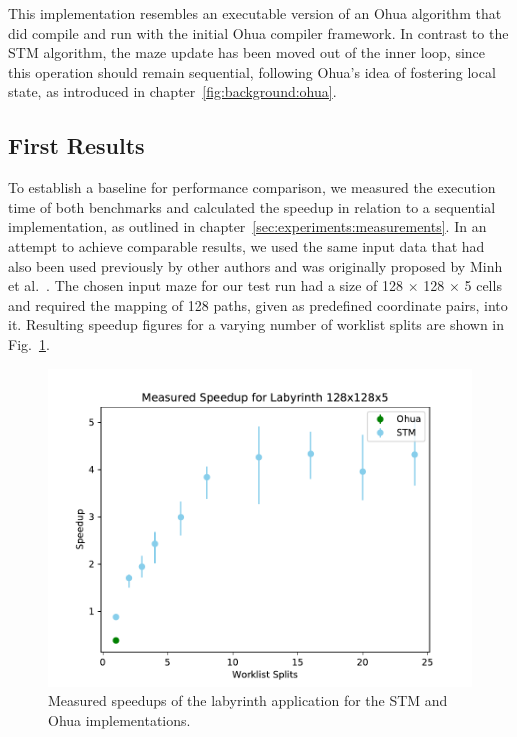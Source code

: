 This implementation resembles an executable version of an Ohua algorithm that did compile and run with the initial Ohua compiler framework.
In contrast to the STM algorithm, the maze update has been moved out of the inner loop, since this operation should remain sequential, following Ohua's idea of fostering local state, as introduced in chapter~\ref{fig:background:ohua}.

\subsection{First Results}

To establish a baseline for performance comparison, we measured the execution time of both benchmarks and calculated the speedup in relation to a sequential implementation, as outlined in chapter~\ref{sec:experiments:measurements}.
In an attempt to achieve comparable results, we used the same input data that had also been used previously by other authors and was originally proposed by Minh et al.~\cite{minh2008stamp}.
The chosen input maze for our test run had a size of 128 $\times$ 128 $\times$ 5 cells and required the mapping of 128 paths, given as predefined coordinate pairs, into it.
Resulting speedup figures for a varying number of worklist splits are shown in Fig.~\ref{fig:preliminaries:initial-results}.

\begin{figure}[h]
    \centering
    \includegraphics[width=.5\textwidth,keepaspectratio]{gfx/preliminaries-labyrinth/2019-04-18-128x128x5}
    \caption{Measured speedups of the labyrinth application for the STM and Ohua implementations.}%
    \label{fig:preliminaries:initial-results}
\end{figure}

